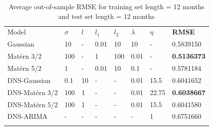 \begin{table}[!htb]
\begin{center}
\caption{Average out-of-sample RMSE for training set length = 12 months and test set length = 12 months}
\label{tab:avg_oos_rmse12}       %
\begin{tabular}{llllllll}
\hline\noalign{\smallskip}
Model              & $\sigma$ & $l$ & $l_1$ & $l_2$  & $\lambda$  & $\eta$  & \textbf{RMSE}  \\
\noalign{\smallskip}\hline\noalign{\smallskip}
  Gaussian         &    10 &  - &   0.01&    10 &    10 & - & 0.5839150 \\
  Mat\'ern 3/2     &   100 &  - & 1 & 100 &   0.01 & - & \textbf{0.5136373}\\
  Mat\'ern 5/2     &   1 & - & 0.01 & 10 & 0.1 & - & 0.5781184\\
\noalign{\smallskip}\hline\noalign{\smallskip}
  DNS-Gaussian     & 0.1 & 10 & - & - & 0.01 & 15.5 & 0.6041652\\
  DNS-Mat\'ern 3/2 & 100 & 1 & - & - & 0.01 & 22.75 & \textbf{0.6038667}\\
  DNS-Mat\'ern 5/2 & 100 & 1 & - & - & 0.01 & 15.5 & 0.6041580\\
  DNS-ARIMA & - & - & - & - & - & 1 & 0.6751660\\
\noalign{\smallskip}\hline
\end{tabular}
\end{center}
\end{table}

